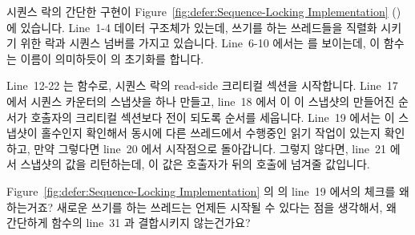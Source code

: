 시퀀스 락의 간단한 구현이
Figure~\ref{fig:defer:Sequence-Locking Implementation}
() 에 있습니다.
Line~1-4 데이터 구조체가 있는데, 쓰기를 하는 쓰레드들을 직렬화
시키기 위한 락과 시퀀스 넘버를 가지고 있습니다.
Line~6-10 에서는  를 보이는데, 이 함수는 이름이 의미하듯이
 의 초기화를 합니다.

Line~12-22 는  함수로, 시퀀스 락의 read-side 크리티컬
섹션을 시작합니다.
Line~17 에서 시퀀스 카운터의 스냅샷을 하나 만들고, line~18 에서 이 이 스냅샷의
만들어진 순서가 호출자의 크리티컬 섹션보다 전이 되도록 순서를 세웁니다.
Line~19 에서는 이 스냅샷이 홀수인지 확인해서 동시에 다른 쓰레드에서 수행중인
읽기 작업이 있는지 확인하고, 만약 그렇다면 line~20 에서 시작점으로 돌아갑니다.
그렇지 않다면, line~21 에서 스냅샷의 값을 리턴하는데, 이 값은 호출자가 뒤의
 호출에 넘겨줄 값입니다.

\QuickQuiz{}
	Figure~\ref{fig:defer:Sequence-Locking Implementation} 의
	 의 line~19 에서의 체크를 왜 하는거죠?
	새로운 쓰기를 하는 쓰레드는 언제든 시작될 수 있다는 점을 생각해서, 왜
	간단하게  함수의 line~31 과 결합시키지 않는건가요?
	\iffalse

